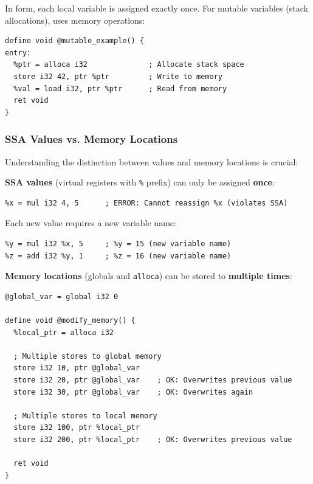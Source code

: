 In  form, each local variable is assigned exactly once. For mutable variables (stack allocations),  uses memory operations:

\begin{lstlisting}[style=ir]
define void @mutable_example() {
entry:
  %ptr = alloca i32              ; Allocate stack space
  store i32 42, ptr %ptr         ; Write to memory
  %val = load i32, ptr %ptr      ; Read from memory
  ret void
}
\end{lstlisting}

\subsubsection*{SSA Values vs. Memory Locations}

Understanding the distinction between  values and memory locations is crucial:

\textbf{SSA values} (virtual registers with \texttt{\%} prefix) can only be assigned \textbf{once}:

\begin{lstlisting}[style=ir]
%x = add i32 1, 2      ; %x = 3
%x = mul i32 4, 5      ; ERROR: Cannot reassign %x (violates SSA)
\end{lstlisting}

Each new value requires a new variable name:

\begin{lstlisting}[style=ir]
%x = add i32 1, 2      ; %x = 3
%y = mul i32 %x, 5     ; %y = 15 (new variable name)
%z = add i32 %y, 1     ; %z = 16 (new variable name)
\end{lstlisting}

\textbf{Memory locations} (globals and \texttt{alloca}) can be stored to \textbf{multiple times}:

\begin{lstlisting}[style=ir]
@global_var = global i32 0

define void @modify_memory() {
  %local_ptr = alloca i32

  ; Multiple stores to global memory
  store i32 10, ptr @global_var
  store i32 20, ptr @global_var    ; OK: Overwrites previous value
  store i32 30, ptr @global_var    ; OK: Overwrites again

  ; Multiple stores to local memory
  store i32 100, ptr %local_ptr
  store i32 200, ptr %local_ptr    ; OK: Overwrites previous value

  ret void
}
\end{lstlisting}

